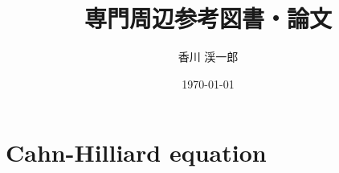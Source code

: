 \documentclass[openary, a4paper, oneside]{jsarticle}
\author{香川 渓一郎}
\date{\today}
\title{専門周辺参考図書・論文}
\begin{document}
\maketitle
\tableofcontents

\section{Cahn-Hilliard equation}
\end{document}
